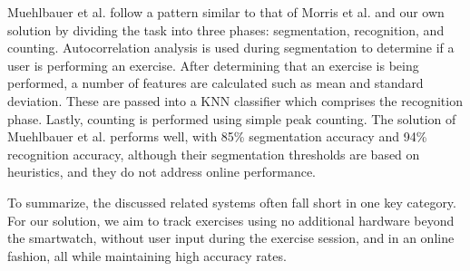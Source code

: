 Muehlbauer et al. \cite{muehlbauer} follow a pattern similar to that of Morris et al. \cite{recofit} and our own solution by dividing the task into three phases: segmentation, recognition, and counting. Autocorrelation analysis is used during segmentation to determine if a user is performing an exercise. After determining that an exercise is being performed, a number of features are calculated such as mean and standard deviation. These are passed into a KNN classifier which comprises the recognition phase. Lastly, counting is performed using simple peak counting. The solution of Muehlbauer et al. performs well, with 85\% segmentation accuracy and 94\% recognition accuracy, although their segmentation thresholds are based on heuristics, and they do not address online performance. 

To summarize, the discussed related systems often fall short in one key category. For our solution, we aim to track exercises using no additional hardware beyond the smartwatch, without user input during the exercise session, and in an online fashion, all while maintaining high accuracy rates. 